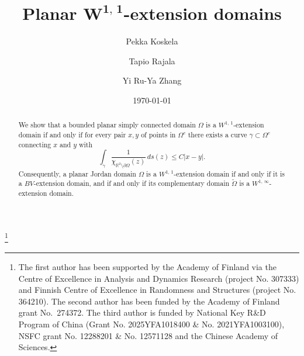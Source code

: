 \documentclass[reqno,11pt]{amsart}
\def\rr{{\mathbb R}}
\def\wz{\widetilde}
\numberwithin{equation}{section}
\theoremstyle{remark}
\begin{document}
\title[Planar $W^{1,\,1}$-extension Domains]
{Planar $\boldsymbol{W^{1,\,1}}$-extension domains}

\author{Pekka Koskela}
\author{Tapio Rajala}
\author{Yi Ru-Ya Zhang}

\address{University of Jyvas\-kyla\\
         Department of Mathematics and Statistics \\
         P.O. Box 35 (MaD) \\
         FI-40014 University of Jyvas\-kyla \\
         Finland}

\address{Academy of Mathematics and Systems Science, the Chinese Academy of Sciences, Beijing 100190, China}



\thanks{The first author has been  supported by the Academy of Finland via the Centre of Excellence in Analysis and Dynamics Research (project No. 307333) and
 Finnish Centre of Excellence in Randomness and Structures (project No. 364210). The second author has been funded by the Academy of Finland grant No.\ 274372. The third author is funded by National Key R\&D Program of China (Grant No. 2025YFA1018400 \&  No. 2021YFA1003100), NSFC grant No. 12288201 \& No. 12571128 and the Chinese Academy of Sciences.}
\date{\today}


\begin{abstract}
We show that a bounded planar simply connected domain $\Omega$ is a 
$W^{1,\,1}$-extension domain 
if and only if for every pair $x,y$ of points in  $\Omega^c$ there exists a 
curve $\gamma \subset \Omega^c$ connecting $x$ and $y$ with
$$ \int_\gamma\frac{1}{\chi_{\rr^2\setminus \partial\Omega}(z)}\,ds(z) \le 
C|x-y|.$$
Consequently, a planar Jordan domain $\Omega$ is a $W^{1,\,1}$-extension domain 
if and only if it is a $BV$-extension domain,
and if and only if its complementary domain $\wz \Omega$ is a $W^{1,\,\infty}$-extension domain. 
\end{abstract}


\maketitle
\end{document}
